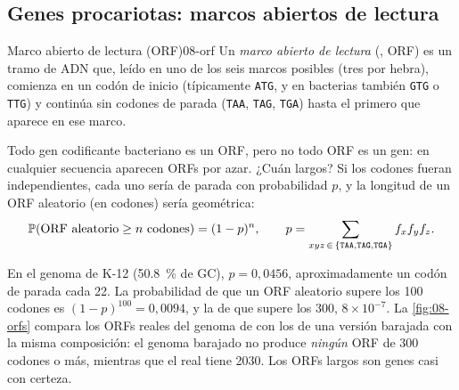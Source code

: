 \subsection{Genes procariotas: marcos abiertos de lectura}

\begin{definicion}{Marco abierto de lectura (ORF)}{08-orf}
Un \emph{marco abierto de lectura} (, ORF) es un tramo de ADN que, leído en uno de los seis marcos posibles (tres por hebra), comienza en un codón de inicio (típicamente \texttt{ATG}, y en bacterias también \texttt{GTG} o \texttt{TTG}) y continúa sin codones de parada (\texttt{TAA}, \texttt{TAG}, \texttt{TGA}) hasta el primero que aparece en ese marco.
\end{definicion}

Todo gen codificante bacteriano es un ORF, pero no todo ORF es un gen: en cualquier secuencia aparecen ORFs por azar. ¿Cuán largos? Si los codones fueran independientes, cada uno sería de parada con probabilidad $p$, y la longitud de un ORF aleatorio (en codones) sería geométrica:
\begin{equation}\label{eq:08-orf}
\mathbb{P}(\text{ORF aleatorio} \ge n \text{ codones}) = (1-p)^{n},
\qquad
p = \sum_{xyz\,\in\,\{\texttt{TAA},\texttt{TAG},\texttt{TGA}\}} f_x f_y f_z .
\end{equation}

\begin{simbolos}
\end{simbolos}

En el genoma de  K-12 (\SI{50,8}{\percent} de GC), $p=0{,}0456$, aproximadamente un codón de parada cada 22. La probabilidad de que un ORF aleatorio supere los 100 codones es $(1-p)^{100}=0{,}0094$, y la de que supere los 300, $8\times10^{-7}$. La \cref{fig:08-orfs} compara los ORFs reales del genoma de  con los de una versión barajada con la misma composición: el genoma barajado no produce \emph{ningún} ORF de 300 codones o más, mientras que el real tiene \num{2030}. Los ORFs largos son genes casi con certeza.

